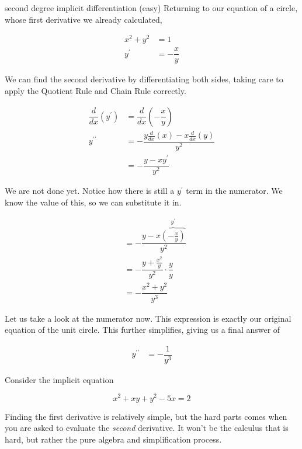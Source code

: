 \begin{example}{second degree implicit differentiation (easy)}
    Returning to our equation of a circle, whose first derivative we already calculated,
    
    \begin{align*}
        x^2 + y^2 &= 1 \\
        y^\prime &= -\dfrac{x}{y}
    \end{align*}
    
    We can find the second derivative by differentiating both sides, taking care to apply the Quotient Rule and Chain Rule correctly.
    
    \begin{align}
        \dfrac{d}{dx} \left( y^\prime \right) &= \dfrac{d}{dx} \left( - \dfrac{x}{y} \right) \\
        y^{\prime \prime} &= -\dfrac{y \frac{d}{dx} \left( x \right) - x \frac{d}{dx} \left( y \right)}{y^2} \\
        &= -\dfrac{y - xy^\prime}{y^2}
    \end{align}
    
    We are not done yet. Notice how there is still a \( y^\prime \) term in the numerator. We know the value of this, so we can substitute it in.
    
    \begin{align}
        &= -\dfrac{y - x \overbrace{\left( -\frac{x}{y} \right)}^{y^\prime}}{y^2} \\
        &= -\dfrac{y + \frac{x^2}{y}}{y^2} \cdot \dfrac{y}{y} \\
        &= -\dfrac{x^2 + y^2}{y^3}
    \end{align}
    
    Let us take a look at the numerator now. This expression is exactly our original equation of the unit circle. This further simplifies, giving us a final answer of
    
    \begin{align}
        y^{\prime\prime} &= -\dfrac{1}{y^3}
    \end{align}
\end{example}

Consider the implicit equation

\[ x^2 + xy + y^2 - 5x = 2 \]

Finding the first derivative is relatively simple, but the hard parts comes when you are asked to evaluate the \textit{second} derivative. It won't be the calculus that is hard, but rather the pure algebra and simplification process.

